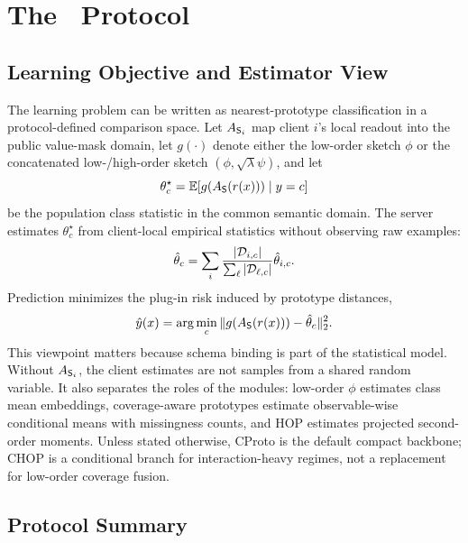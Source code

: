 \section{The \method\ Protocol}

\subsection{Learning Objective and Estimator View}

The learning problem can be written as nearest-prototype classification in a protocol-defined comparison space. Let \(A_{\mathsf{S}_i}\) map client \(i\)'s local readout into the public value-mask domain, let \(g(\cdot)\) denote either the low-order sketch \(\phi\) or the concatenated low-/high-order sketch \((\phi,\sqrt{\lambda}\psi)\), and let
\begin{equation}
    \theta_c^\star = \mathbb{E}[g(A_{\mathsf{S}}(r(x)))\mid y=c]
\end{equation}
be the population class statistic in the common semantic domain. The server estimates \(\theta_c^\star\) from client-local empirical statistics without observing raw examples:
\begin{equation}
    \hat{\theta}_c =
    \sum_i
    \frac{|\mathcal{D}_{i,c}|}{\sum_\ell |\mathcal{D}_{\ell,c}|}
    \hat{\theta}_{i,c}.
\end{equation}
Prediction minimizes the plug-in risk induced by prototype distances,
\begin{equation}
    \hat{y}(x)=
    \arg\min_c
    \|g(A_{\mathsf{S}}(r(x)))-\hat{\theta}_c\|_2^2.
\end{equation}
This viewpoint matters because schema binding is part of the statistical model. Without \(A_{\mathsf{S}_i}\), the client estimates are not samples from a shared random variable. It also separates the roles of the modules: low-order \(\phi\) estimates class mean embeddings, coverage-aware prototypes estimate observable-wise conditional means with missingness counts, and HOP estimates projected second-order moments. Unless stated otherwise, CProto is the default compact backbone; CHOP is a conditional branch for interaction-heavy regimes, not a replacement for low-order coverage fusion.

\subsection{Protocol Summary}

